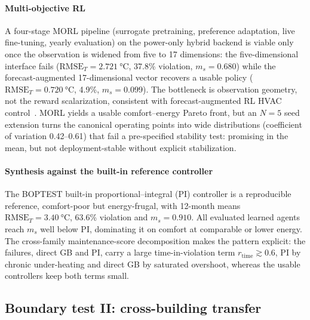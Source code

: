 \documentclass[5p]{elsarticle}
\newcommand{\RMSE}{\ensuremath{\mathrm{RMSE}}}
\newcommand{\ms}{\ensuremath{m_s}}
\begin{document}
\paragraph{Multi-objective RL}
A four-stage MORL pipeline (surrogate pretraining, preference adaptation, live fine-tuning, yearly
evaluation) on the power-only hybrid backend is viable only once the observation is widened from
five to 17 dimensions: the five-dimensional interface fails
($\RMSE_T=\SI{2.721}{\celsius}$, 37.8\% violation, $\ms=0.680$) while the forecast-augmented
17-dimensional vector recovers a usable policy ($\RMSE_T=\SI{0.720}{\celsius}$, 4.9\%,
$\ms=0.099$). The bottleneck is observation geometry, not the reward scalarization, consistent with
forecast-augmented RL HVAC control~\cite{Gao2024Predictive}. MORL yields a usable comfort--energy
Pareto front, but an $N=5$ seed extension turns the canonical operating points into wide
distributions (coefficient of variation 0.42--0.61) that fail a pre-specified stability test:
promising in the mean, but not deployment-stable without explicit stabilization.

\paragraph{Synthesis against the built-in reference controller}
The BOPTEST built-in proportional--integral (PI) controller is a reproducible reference, comfort-poor but energy-frugal, with
12-month means $\RMSE_T=\SI{3.40}{\celsius}$, 63.6\% violation and $\ms=0.910$. All evaluated
learned agents reach \ms{} well below PI, dominating it on comfort at comparable or lower energy.
The cross-family maintenance-score decomposition makes the pattern explicit: the failures, direct GB
and PI, carry a large time-in-violation term $r_{\mathrm{time}}\gtrsim0.6$, PI by chronic
under-heating and direct GB by saturated overshoot, whereas the usable controllers keep both terms
small.

\subsection{Boundary test II: cross-building transfer}\label{sec:transfer}
\end{document}

